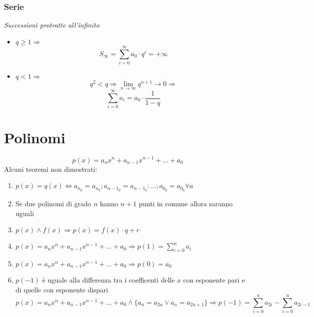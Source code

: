 \documentclass[12pt, a4paper,oneside]{book}
\begin{document}
	\subsection{Serie}
	\textit{Successioni protratte all'infinito}
	\begin{itemize}
		\item $q\ge1\Rightarrow$
		\[
		S_\infty=\sum_{i=0}^{\infty}a_0\cdot q^i=+\infty
		\]
		\item $q<1\Rightarrow$
		\[
		q^2<q\Rightarrow\lim_{n \to \infty}q^{n+1}\to 0\Rightarrow
		\]
		\[
		\sum_{i=0}^{\infty}a_i=a_0\cdot\frac{1}{1-q}
		\]
	\end{itemize}
\chapter{Polinomi}
	\[
	p(x)=a_nx^n+a_{n-1}x^{n-1}+\dots+a_0
	\]
	Alcuni teoremi non dimostrati:
	\begin{enumerate}
		\item $p(x)=q(x)\Leftrightarrow a_{n_p}=a_{n_q}; a_{{n-1}_p}=a_{{n-1}_q}:\dots;a_{0_p}=a_{0_q} \forall a$
		\item Se due polinomi di grado $n$ hanno $n+1$ punti in comune allora saranno uguali
		\item $p(x) \land f(x) \Rightarrow p(x)=f(x)\cdot q+r$
		\item $p(x)=a_nx^n+a_{n-1}x^{n-1}+\dots+a_0\Rightarrow p(1)=\sum_{i=0}^{n}a_i$
		\item $p(x)=a_nx^n+a_{n-1}x^{n-1}+\dots+a_0\Rightarrow p(0)=a_0$
		\item $p(-1)$ è uguale alla differenza tra i coefficenti delle $x$ con esponente pari e di quelle con esponente dispari
		\[
		p(x)=a_nx^n+a_{n-1}x^{n-1}+\dots+a_0\land \{a_n=a_{2u}\lor a_n=a_{2u+1}\}\Rightarrow p(-1)=\sum_{i=0}^{u}a_{2i}-\sum_{i=0}^{u}a_{2i-1}
		\]
	\end{enumerate}
\end{document}
